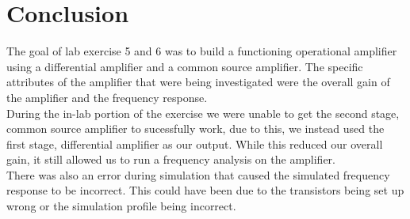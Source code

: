 \documentclass[11pt]{article}
\begin{document}
	\section{Conclusion}
	The goal of lab exercise 5 and 6 was to build a functioning operational amplifier
	using a differential amplifier and a common source amplifier. The specific attributes
	of the amplifier that were being investigated were the overall gain of the amplifier
	and the frequency response. \\

	During the in-lab portion of the exercise we were unable to get the second stage,
	common source amplifier to sucessfully work, due to this, we instead used the first stage, 
	differential amplifier as our output. While this reduced our overall gain, it still allowed
	us to run a frequency analysis on the amplifier. \\

	There was also an error during simulation that caused the simulated frequency response
	to be incorrect. This could have been due to the transistors being set up wrong or the 
	simulation profile being incorrect. 
\end{document}
